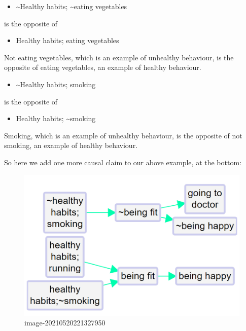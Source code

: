\documentclass[
]{book}
\providecommand{\tightlist}{%
  \setlength{\itemsep}{0pt}\setlength{\parskip}{0pt}}
\begin{document}
\begin{itemize}
\tightlist
\item
  \textasciitilde Healthy habits; \textasciitilde eating vegetables
\end{itemize}

is the opposite of

\begin{itemize}
\tightlist
\item
  Healthy habits; eating vegetables
\end{itemize}

Not eating vegetables, which is an example of unhealthy behaviour, is the opposite of eating vegetables, an example of healthy behaviour.

\begin{itemize}
\tightlist
\item
  \textasciitilde Healthy habits; smoking
\end{itemize}

is the opposite of

\begin{itemize}
\tightlist
\item
  Healthy habits; \textasciitilde smoking
\end{itemize}

Smoking, which is an example of unhealthy behaviour, is the opposite of not smoking, an example of healthy behaviour.

So here we add one more causal claim to our above example, at the bottom:

\begin{figure}
\centering
\includegraphics[width=6.77083in,height=\textheight]{_assets/image-20210520221327950.png}
\caption{image-20210520221327950}
\end{figure}
\end{document}
